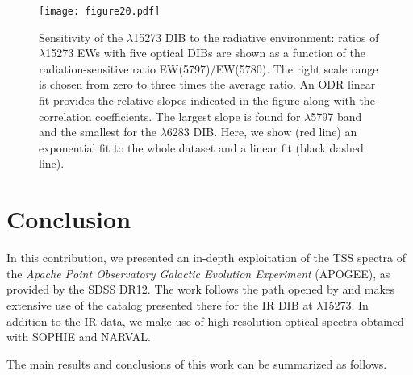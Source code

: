 \documentclass[printer]{aa} %
\begin{document}
\begin{figure*}[!htb]
\centering
\texttt{[image: figure20.pdf]}
\caption{\label{correlation3} Sensitivity of the $\lambda$15273 DIB to the radiative environment: ratios of $\lambda$15273 EWs with five optical DIBs are shown as a function of the radiation-sensitive ratio EW(5797)/EW(5780). The right scale range is chosen from zero to three times the average ratio. An ODR linear fit provides the relative slopes indicated in the figure along with the correlation coefficients. The largest slope is found for $\lambda$5797 band and the smallest for the $\lambda$6283 DIB. Here, we show (red line) an exponential fit to the whole dataset and a linear fit (black dashed line). 
}
\end{figure*}


\section{Conclusion\label{secconclusion}}

In this contribution, we presented an in-depth exploitation of the TSS spectra of the \emph{Apache Point Observatory Galactic Evolution Experiment} (APOGEE), as provided by the SDSS DR12. The work follows the path opened by \citet{Elyajouri16} and makes extensive use of the catalog presented there for the IR DIB at $\lambda$15273. In addition to the IR data, we make use of high-resolution optical spectra obtained with SOPHIE and NARVAL. 

The main results and conclusions of this work can be summarized as follows.
\end{document}
